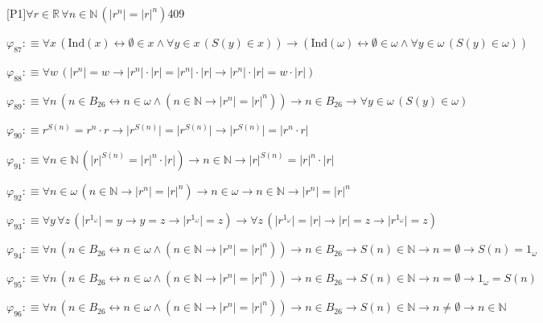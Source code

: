 \begin{fullproof}{[P1]}{$\forall r \in \mathbb{R}\,\forall n \in \mathbb{N}\,(\lvert {{r}^{n}} \rvert = {{\lvert r \rvert}^{n}})$}{409}
\begin{abbrevlist}
\item $\varphi_{87} :\equiv \forall x\,(\mathrm{Ind}(x) \leftrightarrow \emptyset \in x \land \forall y \in x\,(S(y) \in x)) \to (\mathrm{Ind}(\omega) \leftrightarrow \emptyset \in \omega \land \forall y \in \omega\,(S(y) \in \omega))$
\item $\varphi_{88} :\equiv \forall w\,(\lvert {{r}^{n}} \rvert = w \to \lvert {{r}^{n}} \rvert \cdot \lvert r \rvert = \lvert {{r}^{n}} \rvert \cdot \lvert r \rvert \to \lvert {{r}^{n}} \rvert \cdot \lvert r \rvert = w \cdot \lvert r \rvert)$
\item $\varphi_{89} :\equiv \forall n\,(n \in B_{26} \leftrightarrow n \in \omega \land (n \in \mathbb{N} \to \lvert {{r}^{n}} \rvert = {{\lvert r \rvert}^{n}})) \to n \in B_{26} \to \forall y \in \omega\,(S(y) \in \omega)$
\item $\varphi_{90} :\equiv {{r}^{S(n)}} = {{r}^{n}} \cdot r \to \lvert {{r}^{S(n)}} \rvert = \lvert {{r}^{S(n)}} \rvert \to \lvert {{r}^{S(n)}} \rvert = \lvert {{r}^{n}} \cdot r \rvert$
\item $\varphi_{91} :\equiv \forall n \in \mathbb{N}\,({{\lvert r \rvert}^{S(n)}} = {{\lvert r \rvert}^{n}} \cdot \lvert r \rvert) \to n \in \mathbb{N} \to {{\lvert r \rvert}^{S(n)}} = {{\lvert r \rvert}^{n}} \cdot \lvert r \rvert$
\item $\varphi_{92} :\equiv \forall n \in \omega\,(n \in \mathbb{N} \to \lvert {{r}^{n}} \rvert = {{\lvert r \rvert}^{n}}) \to n \in \omega \to n \in \mathbb{N} \to \lvert {{r}^{n}} \rvert = {{\lvert r \rvert}^{n}}$
\item $\varphi_{93} :\equiv \forall y\,\forall z\,(\lvert {{r}^{1_{\omega}}} \rvert = y \to y = z \to \lvert {{r}^{1_{\omega}}} \rvert = z) \to \forall z\,(\lvert {{r}^{1_{\omega}}} \rvert = \lvert r \rvert \to \lvert r \rvert = z \to \lvert {{r}^{1_{\omega}}} \rvert = z)$
\item $\varphi_{94} :\equiv \forall n\,(n \in B_{26} \leftrightarrow n \in \omega \land (n \in \mathbb{N} \to \lvert {{r}^{n}} \rvert = {{\lvert r \rvert}^{n}})) \to n \in B_{26} \to S(n) \in \mathbb{N} \to n = \emptyset \to S(n) = 1_{\omega}$
\item $\varphi_{95} :\equiv \forall n\,(n \in B_{26} \leftrightarrow n \in \omega \land (n \in \mathbb{N} \to \lvert {{r}^{n}} \rvert = {{\lvert r \rvert}^{n}})) \to n \in B_{26} \to S(n) \in \mathbb{N} \to n = \emptyset \to 1_{\omega} = S(n)$
\item $\varphi_{96} :\equiv \forall n\,(n \in B_{26} \leftrightarrow n \in \omega \land (n \in \mathbb{N} \to \lvert {{r}^{n}} \rvert = {{\lvert r \rvert}^{n}})) \to n \in B_{26} \to S(n) \in \mathbb{N} \to n \neq \emptyset \to n \in \mathbb{N}$

\end{abbrevlist}
\end{fullproof}
